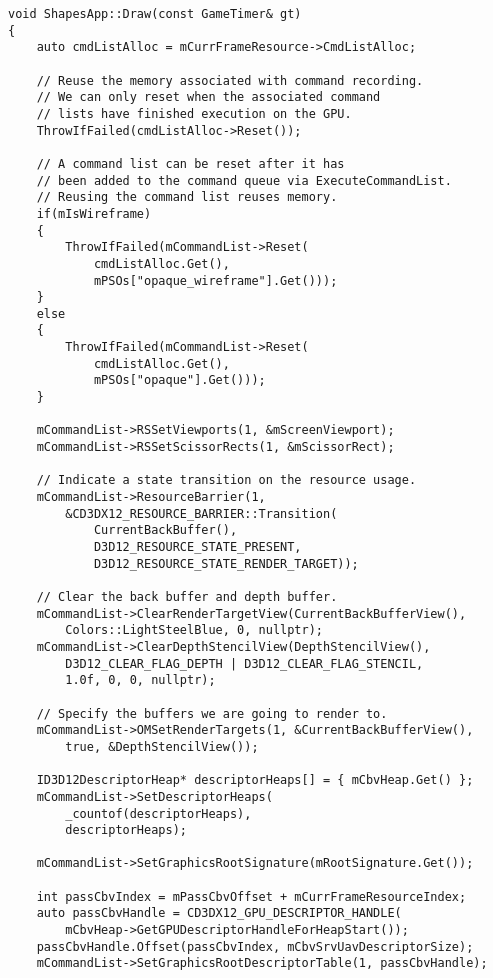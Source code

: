 \begin{lstlisting}
void ShapesApp::Draw(const GameTimer& gt)
{
    auto cmdListAlloc = mCurrFrameResource->CmdListAlloc;

    // Reuse the memory associated with command recording.
    // We can only reset when the associated command 
    // lists have finished execution on the GPU.
    ThrowIfFailed(cmdListAlloc->Reset());

    // A command list can be reset after it has 
    // been added to the command queue via ExecuteCommandList.
    // Reusing the command list reuses memory.
    if(mIsWireframe)
    {
        ThrowIfFailed(mCommandList->Reset(
            cmdListAlloc.Get(), 
            mPSOs["opaque_wireframe"].Get()));
    }
    else
    {
        ThrowIfFailed(mCommandList->Reset(
            cmdListAlloc.Get(), 
            mPSOs["opaque"].Get()));
    }

    mCommandList->RSSetViewports(1, &mScreenViewport);
    mCommandList->RSSetScissorRects(1, &mScissorRect);

    // Indicate a state transition on the resource usage.
    mCommandList->ResourceBarrier(1, 
        &CD3DX12_RESOURCE_BARRIER::Transition(
            CurrentBackBuffer(),
            D3D12_RESOURCE_STATE_PRESENT, 
            D3D12_RESOURCE_STATE_RENDER_TARGET));

    // Clear the back buffer and depth buffer.
    mCommandList->ClearRenderTargetView(CurrentBackBufferView(), 
        Colors::LightSteelBlue, 0, nullptr);
    mCommandList->ClearDepthStencilView(DepthStencilView(), 
        D3D12_CLEAR_FLAG_DEPTH | D3D12_CLEAR_FLAG_STENCIL, 
        1.0f, 0, 0, nullptr);

    // Specify the buffers we are going to render to.
    mCommandList->OMSetRenderTargets(1, &CurrentBackBufferView(), 
        true, &DepthStencilView());

    ID3D12DescriptorHeap* descriptorHeaps[] = { mCbvHeap.Get() };
    mCommandList->SetDescriptorHeaps(
        _countof(descriptorHeaps), 
        descriptorHeaps);

    mCommandList->SetGraphicsRootSignature(mRootSignature.Get());

    int passCbvIndex = mPassCbvOffset + mCurrFrameResourceIndex;
    auto passCbvHandle = CD3DX12_GPU_DESCRIPTOR_HANDLE(
        mCbvHeap->GetGPUDescriptorHandleForHeapStart());
    passCbvHandle.Offset(passCbvIndex, mCbvSrvUavDescriptorSize);
    mCommandList->SetGraphicsRootDescriptorTable(1, passCbvHandle);


\end{lstlisting}
